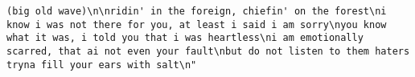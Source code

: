\documentclass[]{article}
\begin{document}
\begin{verbatim}
(big old wave)\n\nridin' in the foreign, chiefin' on the forest\ni know i was not there for you, at least i said i am sorry\nyou know what it was, i told you that i was heartless\ni am emotionally scarred, that ai not even your fault\nbut do not listen to them haters tryna fill your ears with salt\n"                                                                                                                                                                                                                                                                                                                                                                                                                                                                                                                                                                                                                                                                                                                                                                                                                                                                                                                                                                                                                                                                                                                                                                                                                                                                                                                                                                                                                                                                                                                                                                                                                                                                                                                                                                                                                                                                                                                                                                                                                                                                                                                                                                                                                                                                                                                                                                                                                                                                                                                                                                                                                                                                                     

\end{verbatim}
\end{document}
